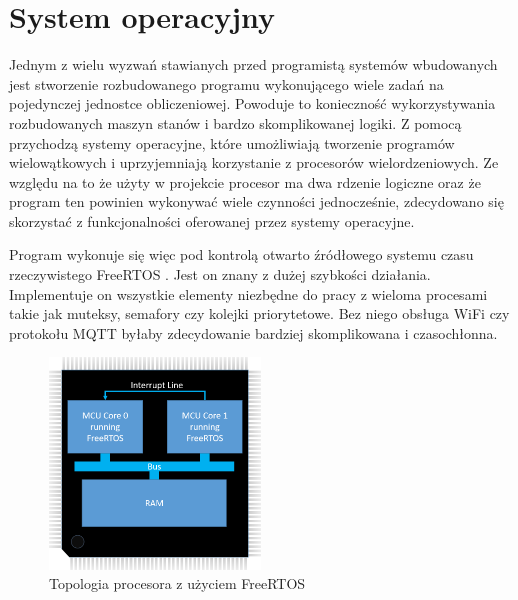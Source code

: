     
        \section{System operacyjny}
            Jednym z wielu wyzwań stawianych przed programistą systemów wbudowanych jest stworzenie rozbudowanego programu wykonującego wiele zadań na pojedynczej jednostce obliczeniowej. Powoduje to konieczność wykorzystywania rozbudowanych maszyn stanów i bardzo skomplikowanej logiki. Z pomocą przychodzą systemy operacyjne, które umożliwiają tworzenie programów wielowątkowych i uprzyjemniają korzystanie z procesorów wielordzeniowych. Ze względu na to że użyty w projekcie procesor ma dwa rdzenie logiczne oraz że program ten powinien wykonywać wiele czynności jednocześnie, zdecydowano się skorzystać z funkcjonalności oferowanej przez systemy operacyjne. 
            
            Program wykonuje się więc pod kontrolą otwarto źródłowego systemu czasu rzeczywistego FreeRTOS \cite{freertos}. Jest on znany z dużej szybkości działania. Implementuje on wszystkie elementy niezbędne do pracy z wieloma procesami takie jak muteksy, semafory czy kolejki priorytetowe. Bez niego obsługa WiFi czy protokołu MQTT byłaby zdecydowanie bardziej skomplikowana i czasochłonna. 
            
            \vspace{1em}
            
            \begin{figure}[ht]
              \centering
              \includegraphics[width=0.5\textwidth]{img/multicore_amp_hardware_configuration.png}
              \caption{Topologia procesora z użyciem FreeRTOS}
              \label{freertos}
            \end{figure}
            
            \vspace{1em}
            
